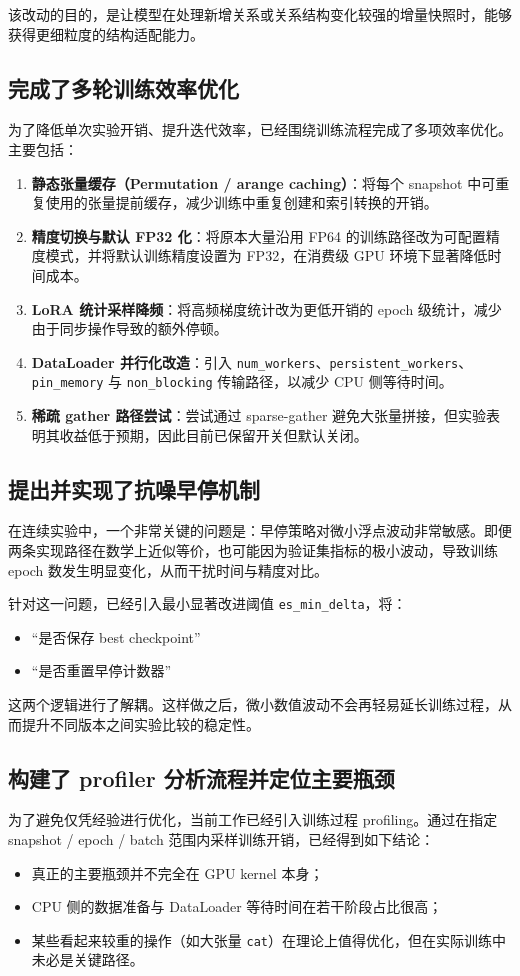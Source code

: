 \documentclass[12pt,a4paper]{ctexart}
\begin{document}
该改动的目的，是让模型在处理新增关系或关系结构变化较强的增量快照时，能够获得更细粒度的结构适配能力。

\subsection{完成了多轮训练效率优化}
为了降低单次实验开销、提升迭代效率，已经围绕训练流程完成了多项效率优化。主要包括：
\begin{enumerate}
  \item \textbf{静态张量缓存（Permutation / arange caching）}：将每个 snapshot 中可重复使用的张量提前缓存，减少训练中重复创建和索引转换的开销。
  \item \textbf{精度切换与默认 FP32 化}：将原本大量沿用 FP64 的训练路径改为可配置精度模式，并将默认训练精度设置为 FP32，在消费级 GPU 环境下显著降低时间成本。
  \item \textbf{LoRA 统计采样降频}：将高频梯度统计改为更低开销的 epoch 级统计，减少由于同步操作导致的额外停顿。
  \item \textbf{DataLoader 并行化改造}：引入 \texttt{num\_workers}、\texttt{persistent\_workers}、\texttt{pin\_memory} 与 \texttt{non\_blocking} 传输路径，以减少 CPU 侧等待时间。
  \item \textbf{稀疏 gather 路径尝试}：尝试通过 sparse-gather 避免大张量拼接，但实验表明其收益低于预期，因此目前已保留开关但默认关闭。
\end{enumerate}

\subsection{提出并实现了抗噪早停机制}
在连续实验中，一个非常关键的问题是：早停策略对微小浮点波动非常敏感。即便两条实现路径在数学上近似等价，也可能因为验证集指标的极小波动，导致训练 epoch 数发生明显变化，从而干扰时间与精度对比。

针对这一问题，已经引入最小显著改进阈值 \texttt{es\_min\_delta}，将：
\begin{itemize}
  \item “是否保存 best checkpoint”
  \item “是否重置早停计数器”
\end{itemize}
这两个逻辑进行了解耦。这样做之后，微小数值波动不会再轻易延长训练过程，从而提升不同版本之间实验比较的稳定性。

\subsection{构建了 profiler 分析流程并定位主要瓶颈}
为了避免仅凭经验进行优化，当前工作已经引入训练过程 profiling。通过在指定 snapshot / epoch / batch 范围内采样训练开销，已经得到如下结论：
\begin{itemize}
  \item 真正的主要瓶颈并不完全在 GPU kernel 本身；
  \item CPU 侧的数据准备与 DataLoader 等待时间在若干阶段占比很高；
  \item 某些看起来较重的操作（如大张量 \texttt{cat}）在理论上值得优化，但在实际训练中未必是关键路径。
\end{itemize}
\end{document}
